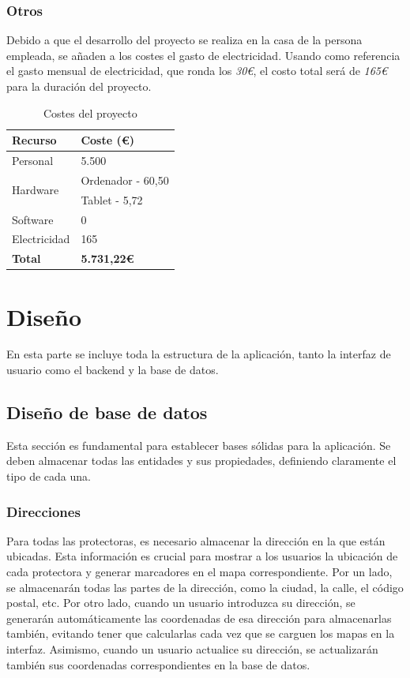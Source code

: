\documentclass[a4paper, 12pt]{article}
\begin{document}
\subsubsection{Otros}

Debido a que el desarrollo del proyecto se realiza en la casa de la persona empleada, se añaden a los costes el gasto de electricidad. Usando como referencia el gasto mensual de electricidad, que ronda los \textit{30€}, el costo total será de \textit{165€} para la duración del proyecto.

\begin{table}[H]
    \centering
    \begin{tabular}{ | m{5cm} | m{5cm} | }
	    \hline \textbf{Recurso} & \textbf{Coste (€)} \\ \hline
	    	Personal & 5.500 \\ \hline
	    	\multirow{2}{*}{Hardware} & Ordenador - 60,50 \\& Tablet - 5,72 \\ \hline
	    	Software & 0 \\ \hline
		Electricidad & 165 \\ \hline
	    \textbf{Total} & \textbf{5.731,22€} \\ \hline
    \end{tabular}
    \caption{Costes del proyecto}
    \label{tab:costes}
\end{table}

\newpage
\section{Diseño}

En esta parte se incluye toda la estructura de la aplicación, tanto la interfaz de usuario como el backend y la base de datos.

\subsection{Diseño de base de datos}

Esta sección es fundamental para establecer bases sólidas para la aplicación. Se deben almacenar todas las entidades y sus propiedades, definiendo claramente el tipo de cada una.

\subsubsection{Direcciones}

Para todas las protectoras, es necesario almacenar la dirección en la que están ubicadas. Esta información es crucial para mostrar a los usuarios la ubicación de cada protectora y generar marcadores en el mapa correspondiente. Por un lado, se almacenarán todas las partes de la dirección, como la ciudad, la calle, el código postal, etc. Por otro lado, cuando un usuario introduzca su dirección, se generarán automáticamente las coordenadas de esa dirección para almacenarlas también, evitando tener que calcularlas cada vez que se carguen los mapas en la interfaz. Asimismo, cuando un usuario actualice su dirección, se actualizarán también sus coordenadas correspondientes en la base de datos.
\end{document}
